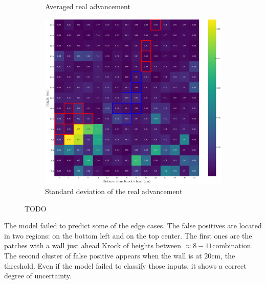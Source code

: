 \documentclass[../document.tex]{subfiles}
\begin{document}
\begin{figure} [htbp]
\begin{subfigure}[b]{0.48\linewidth}
        \caption{Averaged real advancement}
    \end{subfigure}   
    \begin{subfigure}[b]{0.48\linewidth}
        \includegraphics[width=\linewidth]{../img/5/custom_patches/walls_heights/walls_heights_std.png}
        \caption{Standard deviation of the real advancement}
    \end{subfigure}   
\caption{TODO}    
\end{figure}
The model failed to predict some of the edge cases. The false positives are located in two regions: on the bottom left and on the top center. The first ones are the patches with a wall just ahead Krock of heights between $\approx 8 - 11$combination. The second cluster of false positive appears when the wall is at $20$cm, the threshold. Even if the model failed to classify those inputs, it shows a correct degree of uncertainty.
\end{document}
